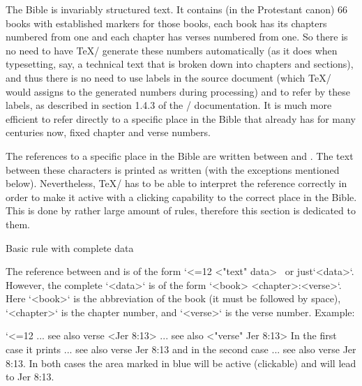 {{The Bible is invariably
structured text. It contains (in the Protestant canon) 66 books with established markers for those books,
each book has its chapters numbered from one and each chapter has verses
numbered from one. So there is no need to have \TeX/ generate these numbers
automatically (as it does when typesetting, say, a technical text that is broken down into
chapters and sections), and thus there is no need to use labels in the source
document (which \TeX/ would assigns to the generated numbers during processing) and to refer by these labels, 
as described in section 1.4.3 of the \OpTeX/ documentation. 
It is much more efficient to refer directly to a specific place in the Bible that already has
for many centuries now,  fixed chapter and verse numbers.


 
 
The references to a specific place in the Bible are written between \code{<} and \code{>}.
The text between these characters is printed as written (with the exceptions mentioned below). 
Nevertheless, \TeX/ has to be able to interpret the reference correctly in order to
make it active with a clicking capability to the correct place in the Bible. This is done by
rather large amount of rules, therefore this section is dedicated to them.


\secc[uudaj] Basic rule with complete data

The reference between \code{<} and \code{>} is of the form 
\begtt\catcode`<=12
<"text" data>
\endtt
\ or just`<data>`. 
However, the complete `<data>` is of the form `<book> <chapter>:<verse>`. Here `<book>` is the abbreviation of the book (it must be followed by
space), `<chapter>` is the chapter number, and `<verse>` is the verse number.
Example:

\begtt \catcode`<=12
... see also verse <Jer 8:13>
... see also <"verse" Jer 8:13>
\endtt
In the first case it prints ... see also verse {\Blue Jer 8:13} and in the second case
... see also {\Blue verse Jer 8:13}. 
In both cases the area marked in blue will be active (clickable) and will lead to Jer 8:13.


}}
